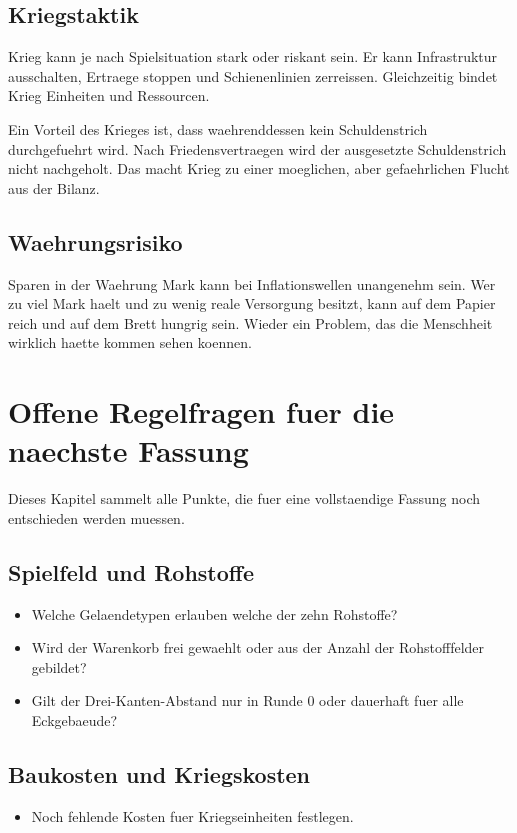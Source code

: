 \documentclass[11pt,a4paper,oneside,parskip=half]{scrreprt}
\begin{document}
\section{Kriegstaktik}
Krieg kann je nach Spielsituation stark oder riskant sein. Er kann Infrastruktur ausschalten, Ertraege stoppen und Schienenlinien zerreissen. Gleichzeitig bindet Krieg Einheiten und Ressourcen.

Ein Vorteil des Krieges ist, dass waehrenddessen kein Schuldenstrich durchgefuehrt wird. Nach Friedensvertraegen wird der ausgesetzte Schuldenstrich nicht nachgeholt. Das macht Krieg zu einer moeglichen, aber gefaehrlichen Flucht aus der Bilanz.

\section{Waehrungsrisiko}
Sparen in der Waehrung Mark kann bei Inflationswellen unangenehm sein. Wer zu viel Mark haelt und zu wenig reale Versorgung besitzt, kann auf dem Papier reich und auf dem Brett hungrig sein. Wieder ein Problem, das die Menschheit wirklich haette kommen sehen koennen.

\chapter{Offene Regelfragen fuer die naechste Fassung}

Dieses Kapitel sammelt alle Punkte, die fuer eine vollstaendige Fassung noch entschieden werden muessen.

\section{Spielfeld und Rohstoffe}
\begin{itemize}
  \item Welche Gelaendetypen erlauben welche der zehn Rohstoffe?
  \item Wird der Warenkorb frei gewaehlt oder aus der Anzahl der Rohstofffelder gebildet?
  \item Gilt der Drei-Kanten-Abstand nur in Runde 0 oder dauerhaft fuer alle Eckgebaeude?
\end{itemize}

\section{Baukosten und Kriegskosten}
\begin{itemize}
  \item Noch fehlende Kosten fuer Kriegseinheiten festlegen.
\end{itemize}
\end{document}
